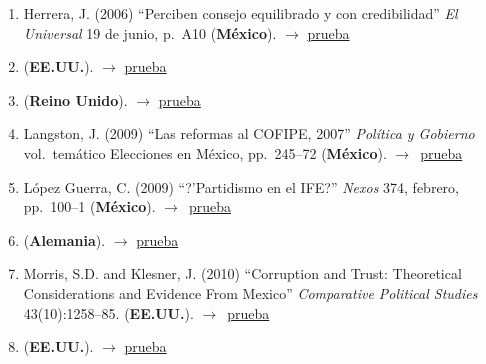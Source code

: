 \documentclass[12 pt, letter]{article}
\newenvironment{CitasMiTrabajo}{
    \begin{footnotesize}
    \begin{enumerate}[label={\footnotesize\emph{cita~\arabic*}},ref=\arabic*] %
        \setlength{\itemsep}{.1\itemsep}
        \setlength{\parskip}{.1\parskip}
    }{\end{enumerate}\end{footnotesize}}
\begin{document}
\begin{CitasMiTrabajo}
        \item Herrera, J. (2006)
        ``Perciben consejo equilibrado y con
        credibilidad'' \emph{El Universal} 19 de junio, p.\ A10  (\textbf{M\'exico}). $\rightarrow$ \href{https://github.com/emagar/cv/blob/master/citasMiTrab/estevezEtalElecStud/univ.pdf}{prueba}

        \item {} (\textbf{EE.UU.}).  $\rightarrow$ \href{https://github.com/emagar/cv/blob/master/citasMiTrab/estevezEtalElecStud/hyde2015.pdf}{prueba}

        \item {} (\textbf{Reino Unido}).  $\rightarrow$ \href{https://rsa.tandfonline.com/doi/ref/10.1080/21599165.2014.990960?scroll=top#.XdQjvVlKiV4}{prueba}
          
        \item Langston, J. (2009) ``Las reformas al COFIPE, 2007''
            \emph{Pol\'itica y Gobierno}
            vol.\ tem\'atico Elecciones en M\'exico, pp.\ 245--72 (\textbf{M\'exico}). $\rightarrow$~\href{https://github.com/emagar/cv/blob/master/citasMiTrab/estevezEtalElecStud/langstonRefCofipe2009pyg.excerpt.pdf}{prueba}
            
        \item L\'opez Guerra, C. (2009)
        ``?'Partidismo en el IFE?''
        \emph{Nexos} 374, febrero, pp.\ 100--1 (\textbf{M\'exico}). $\rightarrow$~\href{https://github.com/emagar/cv/blob/master/citasMiTrab/estevezEtalElecStud/lg.pdf}{prueba}

        \item {} (\textbf{Alemania}).  $\rightarrow$ \href{https://github.com/emagar/cv/blob/master/citasMiTrab/estevezEtalElecStud/martin2015.pdf}{prueba}

        \item Morris, S.D. and Klesner, J. (2010)
            ``Corruption and Trust: Theoretical Considerations and Evidence From Mexico''
            \emph{Comparative Political Studies} 43(10):1258--85. (\textbf{EE.UU.}). $\rightarrow$~\href{https://github.com/emagar/cv/blob/master/citasMiTrab/estevezEtalElecStud/morris.klesnerCorruptionTrustMx2010cps.pdf}{prueba}

        \item {} (\textbf{EE.UU.}).  $\rightarrow$ \href{https://www.cambridge.org/core/journals/government-and-opposition/article/when-informality-advantages-women-quota-networks-electoral-rules-and-candidate-selection-in-mexico/EEE342F39C2F423A30D30C0F8F5BAA9F}{prueba}
          

\end{CitasMiTrabajo}
\end{document}
